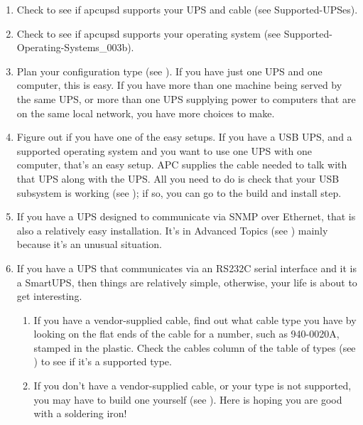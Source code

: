 \begin{enumerate}
\item Check to see if apcupsd supports your UPS and cable
   (see  
   {Supported-UPSes}).  
\item Check to see if apcupsd supports your operating system
   (see 
   {Supported-Operating-Systems_003b}).  
\item Plan your configuration type (see 
   ).  If you have just one UPS
   and one computer, this is easy.  If you have more than one machine being
   served by the same UPS, or more than one UPS supplying power to computers that
   are on the same local network, you have more choices to make.  
\item Figure out if you have one of the easy setups.  If you have a USB
   UPS, and a supported operating system and you want to use one UPS with one
   computer, that's an easy setup.  APC supplies the cable needed to talk with
   that UPS along with the UPS. All you need to do is check that your USB 
   subsystem is working (see ); 
   if so, you can go to the build and install step.  
\item If you have a UPS designed to communicate via SNMP over Ethernet, that
   is also a relatively easy installation. It's in Advanced Topics (see 
   ) mainly because it's an
   unusual situation.  
\item If you have a UPS that communicates via an RS232C serial interface and
   it is a SmartUPS, then things are relatively simple, otherwise, your life is
   about to get interesting.  

\begin{enumerate}
\item If you have a vendor-supplied cable, find out what cable type you have
   by looking on the flat ends of the cable for a number, such as 940-0020A,
   stamped in the plastic.  Check the cables column of the table of types (see 
   ) to see if it's a supported
   type.  
\item If you don't have a vendor-supplied cable, or your type is not
   supported, you may have to build one yourself (see 
   ).  Here is hoping you are good with a
   soldering iron!  
\end{enumerate}


\end{enumerate}
